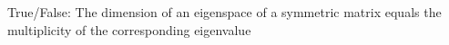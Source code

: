 \documentclass{ximera}
\begin{document}
  	  		                            \begin{question} 
  	  		                       	True/False: The dimension of an eigenspace of a symmetric matrix equals the multiplicity of the corresponding eigenvalue
  	  		                       	\begin{multipleChoice}
  	  		                       	\end{multipleChoice}
  	  		                       	
  	  		                       \end{question}
    		         
  
\end{document}
